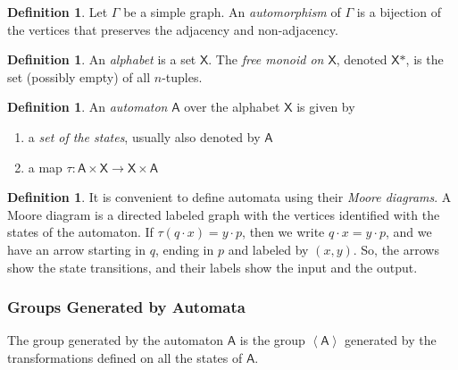 \documentclass[11pt]{amsart}
\theoremstyle{definition}
\newtheorem{definition}[theorem]{Definition}
\theoremstyle{remark}
\numberwithin{equation}{section}
\begin{document}
\begin{definition}
Let $\Gamma$ be a simple graph. An \textit{automorphism} of $\Gamma$ is a bijection of the vertices that preserves the adjacency and non-adjacency. 
\end{definition}

\begin{definition}
An \textit{alphabet} is a set $\textsf{X}$. The \textit{free monoid on $\textsf{X}$}, denoted $\textsf{X*}$, is the set (possibly empty) of all $n$-tuples.
\end{definition}

\begin{definition}    
An \textit{automaton} $\textsf{A}$ over the alphabet $\textsf{X}$ is given by
\begin{enumerate}
\item a \textit{set of the states}, usually also denoted by $\textsf{A}$
\item a map $\tau : \textsf{A}\times \textsf{X} \rightarrow \textsf{X}\times \textsf{A}$
\end{enumerate}
\end{definition}

\begin{definition}
It is convenient to define automata using their \textit{Moore diagrams}. A Moore diagram is a directed labeled graph with the vertices identified with the states of the automaton. If $\tau(q \cdot x) = y \cdot p$, then we write $q\cdot x=y\cdot p$, and we have an arrow starting in $q$, ending in $p$ and labeled by $(x,y)$. So, the arrows show the state transitions, and their labels show the input and the output.
\end{definition}

\subsubsection{Groups Generated by Automata}\text{\space} The group generated by the automaton $\textsf{A}$ is the group $\left\langle \textsf{A} \right\rangle$ generated by the transformations defined on all the states of $\textsf{A}$.\\
\end{document}
